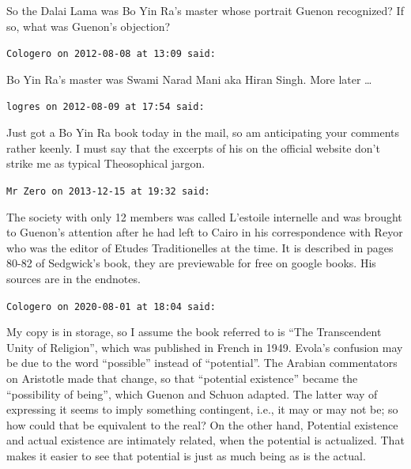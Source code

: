 \begin{footnotesize}
\begin{sffamily}
So the Dalai Lama was Bo Yin Ra's master whose portrait Guenon recognized? If so, what was Guenon's objection?


\hfill

\texttt{Cologero on 2012-08-08 at 13:09 said: }

Bo Yin Ra's master was Swami Narad Mani aka Hiran Singh. More later …


\hfill

\texttt{logres on 2012-08-09 at 17:54 said: }

Just got a Bo Yin Ra book today in the mail, so am anticipating your comments rather keenly. I must say that the excerpts of his on the official website don't strike me as typical Theosophical jargon.


\hfill

\texttt{Mr Zero on 2013-12-15 at 19:32 said: }

The society with only 12 members was called L'estoile internelle and was brought to Guenon's attention after he had left to Cairo in his correspondence with Reyor who was the editor of Etudes Traditionelles at the time. It is described in pages 80-82 of Sedgwick's book, they are previewable for free on google books. His sources are in the endnotes.


\hfill

\texttt{Cologero on 2020-08-01 at 18:04 said: }

My copy is in storage, so I assume the book referred to is “The Transcendent Unity of Religion”, which was published in French in 1949. Evola's confusion may be due to the word “possible” instead of “potential”. The Arabian commentators on Aristotle made that change, so that “potential existence” became the “possibility of being”, which Guenon and Schuon adapted. The latter way of expressing it seems to imply something contingent, i.e., it may or may not be; so how could that be equivalent to the real? On the other hand, Potential existence and actual existence are intimately related, when the potential is actualized. That makes it easier to see that potential is just as much being as is the actual.


\hfill
\end{sffamily}\end{footnotesize}
